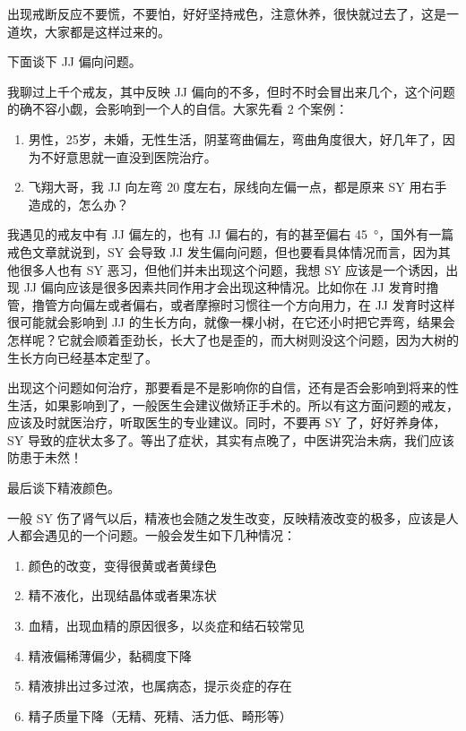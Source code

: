 \documentclass{ctexart}
\begin{document}
出现戒断反应不要慌，不要怕，好好坚持戒色，注意休养，很快就过去了，这是一道坎，大家都是这样过来的。

下面谈下 JJ 偏向问题。

我聊过上千个戒友，其中反映 JJ 偏向的不多，但时不时会冒出来几个，这个问题的确不容小觑，会影响到一个人的自信。大家先看 2 个案例：

\begin{enumerate}
    \item 男性，25岁，未婚，无性生活，阴茎弯曲偏左，弯曲角度很大，好几年了，因为不好意思就一直没到医院治疗。
    \item 飞翔大哥，我 JJ 向左弯 20 度左右，尿线向左偏一点，都是原来 SY 用右手造成的，怎么办？
\end{enumerate}

我遇见的戒友中有 JJ 偏左的，也有 JJ 偏右的，有的甚至偏右 \SI{45}{\degree}，国外有一篇戒色文章就说到，SY 会导致 JJ 发生偏向问题，但也要看具体情况而言，因为其他很多人也有 SY 恶习，但他们并未出现这个问题，我想 SY 应该是一个诱因，出现 JJ 偏向应该是很多因素共同作用才会出现这种情况。比如你在 JJ 发育时撸管，撸管方向偏左或者偏右，或者摩擦时习惯往一个方向用力，在 JJ 发育时这样很可能就会影响到 JJ 的生长方向，就像一棵小树，在它还小时把它弄弯，结果会怎样呢？它就会顺着歪劲长，长大了也是歪的，而大树则没这个问题，因为大树的生长方向已经基本定型了。

出现这个问题如何治疗，那要看是不是影响你的自信，还有是否会影响到将来的性生活，如果影响到了，一般医生会建议做矫正手术的。所以有这方面问题的戒友，应该及时就医治疗，听取医生的专业建议。同时，不要再 SY 了，好好养身体，SY 导致的症状太多了。等出了症状，其实有点晚了，中医讲究治未病，我们应该防患于未然！

最后谈下精液颜色。

一般 SY 伤了肾气以后，精液也会随之发生改变，反映精液改变的极多，应该是人人都会遇见的一个问题。一般会发生如下几种情况：

\begin{enumerate}
    \item 颜色的改变，变得很黄或者黄绿色
    \item 精不液化，出现结晶体或者果冻状
    \item 血精，出现血精的原因很多，以炎症和结石较常见
    \item 精液偏稀薄偏少，黏稠度下降
    \item 精液排出过多过浓，也属病态，提示炎症的存在
    \item 精子质量下降（无精、死精、活力低、畸形等）
\end{enumerate}
\end{document}
